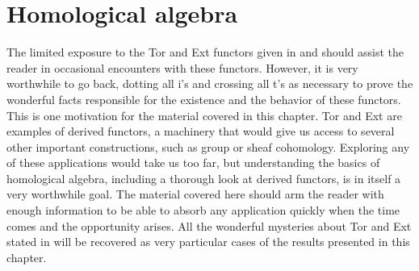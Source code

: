 \chapter{Homological algebra}
\label{chap:homol}

The limited exposure to the Tor and Ext functors given in
 and
should assist the reader in occasional encounters with these
functors. However, it is very worthwhile to go back, dotting all i's
and crossing all t's as necessary to prove the wonderful facts
responsible for the existence and the behavior of these functors. This
is one motivation for the material covered in this chapter. Tor and
Ext are examples of derived functors, a machinery that would give us
access to several other important constructions, such as group or
sheaf cohomology. Exploring any of these applications would take us
too far, but understanding the basics of homological algebra,
including a thorough look at derived functors, is in itself a very
worthwhile goal.  The material covered here should arm the reader with
enough information to be able to absorb any application quickly when
the time comes and the opportunity arises. All the wonderful mysteries
about Tor and Ext stated in  will be recovered as
very particular cases of the results presented in this chapter.

